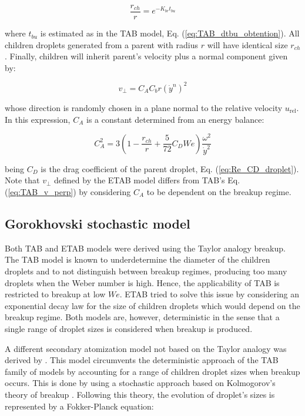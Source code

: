 \begin{equation}
\label{eq:ETAB_model_radius_ratio}
\frac{r_{ch}}{r} = e ^{-K_{br} t_{bu}}
\end{equation}

where $t_{bu}$ is estimated as in the TAB model, Eq. (\ref{eq:TAB_dtbu_obtention}). All children droplets generated from a parent with radius $r$ will have identical size $r_{ch}$. Finally, children will inherit parent's velocity plus a normal component given by:

\begin{equation}
v_\perp = C_A C_b r \left(\dot{y}^n\right)^2 
\end{equation}

whose direction is randomly chosen in a plane normal to the relative velocity $u_\mathrm{rel}$. In this expression, $C_A$ is a constant determined from an energy balance:

\begin{equation}
C_A^2 = 3 \left( 1 - \frac{r_{ch}}{r} + \frac{5}{72} C_D We \right) \frac{\omega^2}{\dot{y}^2}
\end{equation}

being $C_D$ is the drag coefficient of the parent droplet, Eq. (\ref{eq:Re_CD_droplet}). Note that $v_\perp$ defined by the ETAB model differs from TAB's Eq. (\ref{eq:TAB_v_perp}) by considering $C_A$ to be dependent on the breakup regime.


\subsection{Gorokhovski stochastic model}
\label{subsec:ch4_goro_model}

Both TAB and ETAB models were derived using the Taylor analogy breakup. The TAB model is known to underdetermine the diameter of the children droplets and to not distinguish between breakup regimes, producing too many droplets when the Weber number is high. Hence, the applicability of TAB is restricted to breakup at low $We$. ETAB tried to solve this issue by considering an exponential decay law for the size of children droplets which would depend on the breakup regime. Both models are, however, deterministic in the sense that a single range of droplet sizes is considered when breakup is produced.

A different secondary atomization model not based on the Taylor analogy was derived by . This model circumvents the deterministic approach of the TAB family of models by accounting for a range of children droplet sizes when breakup occurs. This is done by using a stochastic approach based on Kolmogorov's theory of breakup . Following this theory, the evolution of droplet's sizes is represented by a Fokker-Planck equation: 

